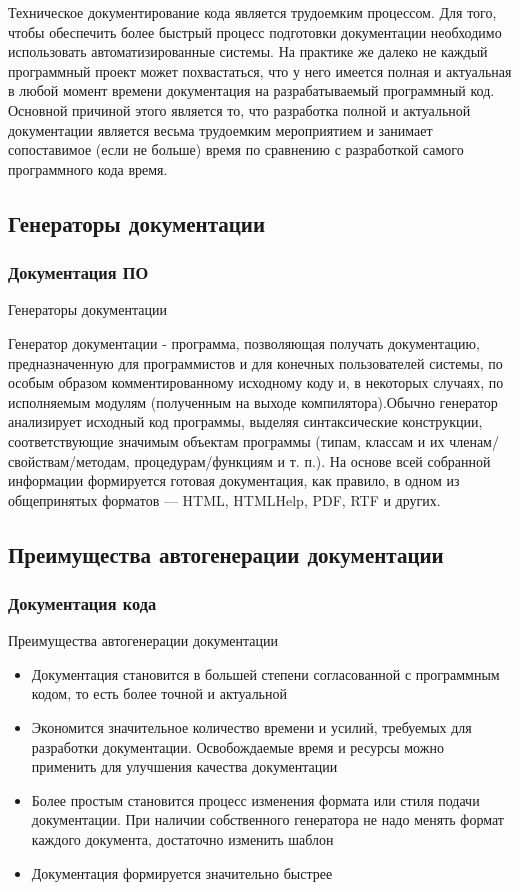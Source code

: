 \documentclass{industrial-development}
\begin{document}
\lecturenotes
Техническое документирование кода является трудоемким процессом.  Для того, чтобы обеспечить более быстрый процесс подготовки документации необходимо использовать автоматизированные системы.
На практике же далеко не каждый программный проект может похвастаться, что у него имеется полная и актуальная в любой момент времени документация на разрабатываемый программный код.
Основной причиной этого является то, что разработка полной и актуальной документации является весьма трудоемким мероприятием и занимает сопоставимое (если не больше) время по сравнению с разработкой самого программного кода время.

\subsection{Генераторы документации}
\begin{frame} \frametitle{Документация ПО}
  \begin{block}{Генераторы документации}
  \end{block}
Генератор документации -  программа, позволяющая получать документацию, предназначенную для программистов и для конечных пользователей системы, по особым образом комментированному исходному коду и, в некоторых случаях, по исполняемым модулям (полученным на выходе компилятора).Обычно генератор анализирует исходный код программы, выделяя синтаксические конструкции, соответствующие значимым объектам программы (типам, классам и их членам/свойствам/методам, процедурам/функциям и т. п.).  На основе всей собранной информации формируется готовая документация, как правило, в одном из общепринятых форматов — HTML, HTMLHelp, PDF, RTF и других. 
\end{frame}
\lecturenotes

\subsection{Преимущества автогенерации документации}
\begin{frame} \frametitle{Документация кода}
  \begin{block}{Преимущества автогенерации документации}
  \end{block}
  \begin{itemize}
  \item Документация становится в большей степени согласованной с программным кодом, то есть более точной и актуальной
  \item Экономится значительное количество времени и усилий, требуемых для разработки документации. Освобождаемые время и ресурсы можно применить для улучшения качества документации
  \item Более простым становится процесс изменения формата или стиля подачи документации. При наличии собственного генератора не надо менять формат каждого документа, достаточно изменить шаблон
  \item Документация формируется значительно быстрее
  \end{itemize}
\end{frame}
\lecturenotes
\end{document}
